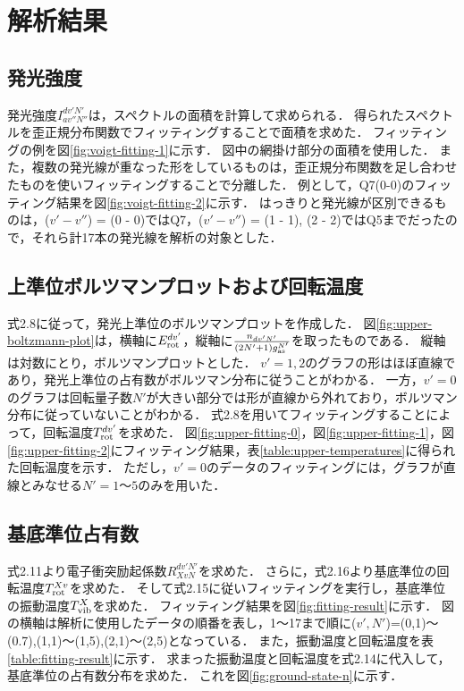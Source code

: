 \chapter{解析結果}

\section{発光強度}
発光強度$I^{dv'N'}_{av''N''}$は，スペクトルの面積を計算して求められる．
得られたスペクトルを歪正規分布関数でフィッティングすることで面積を求めた．
フィッティングの例を図\ref{fig:voigt-fitting-1}に示す．
図中の網掛け部分の面積を使用した．
また，複数の発光線が重なった形をしているものは，歪正規分布関数を足し合わせたものを使いフィッティングすることで分離した．
例として，Q7(0-0)のフィッティング結果を図\ref{fig:voigt-fitting-2}に示す．
はっきりと発光線が区別できるものは，($v'-v''$) = (0 - 0)ではQ7，($v'-v''$) = (1 - 1), (2 - 2)ではQ5までだったので，それら計17本の発光線を解析の対象とした．

\section{上準位ボルツマンプロットおよび回転温度}
式2.8に従って，発光上準位のボルツマンプロットを作成した．
図\ref{fig:upper-boltzmann-plot}は，横軸に$E^{dv'}_{\rm rot}$，縦軸に$\frac{n_{dv'N'}}{\left( 2N'+1 \right) g^{N'}_{\rm as}}$を取ったものである．
縦軸は対数にとり，ボルツマンプロットとした．
$v'=1,2$のグラフの形はほぼ直線であり，発光上準位の占有数がボルツマン分布に従うことがわかる．
一方，$v'=0$のグラフは回転量子数$N'$が大きい部分では形が直線から外れており，ボルツマン分布に従っていないことがわかる．
式2.8を用いてフィッティングすることによって，回転温度$T^{dv'}_{\rm rot}$を求めた．
図\ref{fig:upper-fitting-0}，図\ref{fig:upper-fitting-1}，図\ref{fig:upper-fitting-2}にフィッティング結果，表\ref{table:upper-temperatures}に得られた回転温度を示す．
ただし，$v'=0$のデータのフィッティングには，グラフが直線とみなせる$N'=1〜5$のみを用いた．

\section{基底準位占有数}
式2.11より電子衝突励起係数$R^{dv'N'}_{XvN}$を求めた．
さらに，式2.16より基底準位の回転温度$T^{Xv}_{\rm rot}$を求めた．
そして式2.15に従いフィッティングを実行し，基底準位の振動温度$T^{X}_{\rm vib}$を求めた．
フィッティング結果を図\ref{fig:fitting-result}に示す．
図の横軸は解析に使用したデータの順番を表し，1〜17まで順に($v',N'$)=(0,1)〜(0.7),(1,1)〜(1,5),(2,1)〜(2,5)となっている．
また，振動温度と回転温度を表\ref{table:fitting-result}に示す．
求まった振動温度と回転温度を式2.14に代入して，基底準位の占有数分布を求めた．
これを図\ref{fig:ground-state-n}に示す．